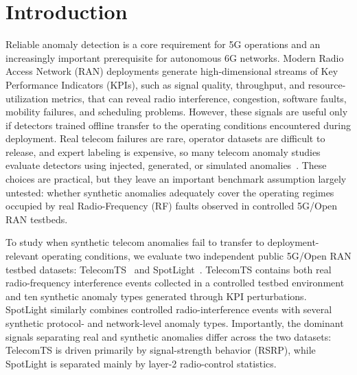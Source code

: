 \documentclass[sigconf,review]{acmart}
\begin{document}
\maketitle
\section{Introduction}
\label{sec:intro}

Reliable anomaly detection is a core requirement for 5G operations and an increasingly important prerequisite for autonomous 6G networks. Modern Radio Access Network (RAN) deployments generate high-dimensional streams of Key Performance Indicators (KPIs), such as signal quality, throughput, and resource-utilization metrics, that can reveal radio interference, congestion, software faults, mobility failures, and scheduling problems. However, these signals are useful only if detectors trained offline transfer to the operating conditions encountered during deployment. Real telecom failures are rare, operator datasets are difficult to release, and expert labeling is expensive, so many telecom anomaly studies evaluate detectors using injected, generated, or simulated anomalies~\citep{wu2018cellpad,wang2021tsagen,hasan2024simba}. These choices are practical, but they leave an important benchmark assumption largely untested: whether synthetic anomalies adequately cover the operating regimes occupied by real Radio-Frequency (RF) faults observed in controlled 5G/Open RAN testbeds.

To study when synthetic telecom anomalies fail to transfer to deployment-relevant operating conditions, we evaluate two independent public 5G/Open RAN testbed datasets: TelecomTS~\citep{feng2025telecomts} and SpotLight~\citep{sun2024spotlight}. TelecomTS contains both real radio-frequency interference events collected in a controlled testbed environment and ten synthetic anomaly types generated through KPI perturbations. SpotLight similarly combines controlled radio-interference events with several synthetic protocol- and network-level anomaly types. Importantly, the dominant signals separating real and synthetic anomalies differ across the two datasets: TelecomTS is driven primarily by signal-strength behavior (RSRP), while SpotLight is separated mainly by layer-2 radio-control statistics. 
\end{document}

